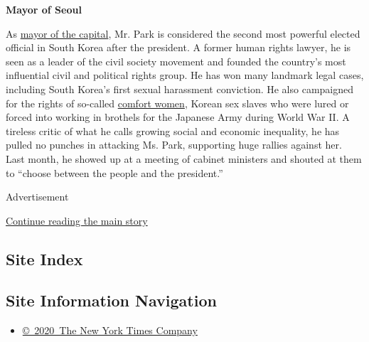 \textbf{Mayor of Seoul}

As
\href{http://www.nytimes.com/2011/10/27/world/asia/vote-on-seoul-mayor-seen-as-having-wider-implications.html}{mayor
of the capital}, Mr. Park is considered the second most powerful elected
official in South Korea after the president. A former human rights
lawyer, he is seen as a leader of the civil society movement and founded
the country's most influential civil and political rights group. He has
won many landmark legal cases, including South Korea's first sexual
harassment conviction. He also campaigned for the rights of so-called
\href{http://www.nytimes.com/2015/12/29/world/asia/comfort-women-south-korea-japan.html}{comfort
women}, Korean sex slaves who were lured or forced into working in
brothels for the Japanese Army during World War II. A tireless critic of
what he calls growing social and economic inequality, he has pulled no
punches in attacking Ms. Park, supporting huge rallies against her. Last
month, he showed up at a meeting of cabinet ministers and shouted at
them to ``choose between the people and the president.''

Advertisement

\protect\hyperlink{after-bottom}{Continue reading the main story}

\hypertarget{site-index}{%
\subsection{Site Index}\label{site-index}}

\hypertarget{site-information-navigation}{%
\subsection{Site Information
Navigation}\label{site-information-navigation}}

\begin{itemize}
\tightlist
\item
  \href{https://help.nytimes.com/hc/en-us/articles/115014792127-Copyright-notice}{©~2020~The
  New York Times Company}
\end{itemize}

